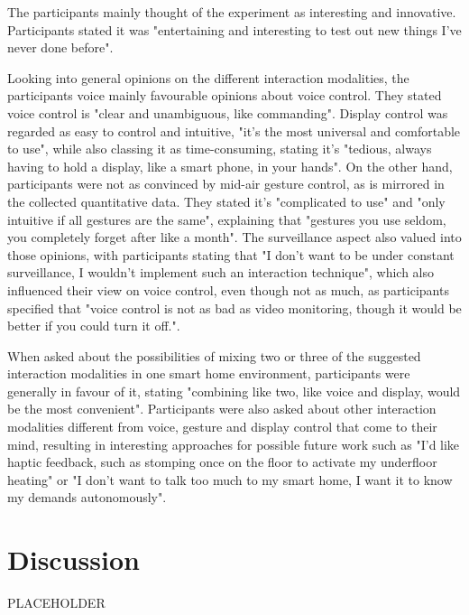 \documentclass[sigchi]{acmart}
\begin{document}
	The participants mainly thought of the experiment as interesting and innovative. Participants stated it was "entertaining and interesting to test out new things I've never done before". 
	
	Looking into general opinions on the different interaction modalities, the participants voice mainly favourable opinions about voice control. They stated voice control is "clear and unambiguous, like commanding". Display control was regarded as easy to control and intuitive, "it's the most universal and comfortable to use", while also classing it as time-consuming, stating it's "tedious, always having to hold a display, like a smart phone, in your hands". On the other hand, participants were not as convinced by mid-air gesture control, as is mirrored in the collected quantitative data. They stated it's "complicated to use" and "only intuitive if all gestures are the same", explaining that "gestures you use seldom, you completely forget after like a month". The surveillance aspect also valued into those opinions, with participants stating that "I don't want to be under constant surveillance, I wouldn't implement such an interaction technique", which also influenced their view on voice control, even though not as much, as participants specified that "voice control is not as bad as video monitoring, though it would be better if you could turn it off.". 
	
	When asked about the possibilities of mixing two or three of the suggested interaction modalities in one smart home environment, participants were generally in favour of it, stating "combining like two, like voice and display, would be the most convenient". Participants were also asked about other interaction modalities different from voice, gesture and display control that come to their mind, resulting in interesting approaches for possible future work such as "I'd like haptic feedback, such as stomping once on the floor to activate my underfloor heating" or "I don't want to talk too much to my smart home, I want it to know my demands autonomously". 
	
	\section{Discussion}
	PLACEHOLDER
	
\end{document}
